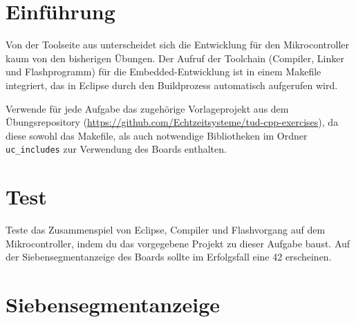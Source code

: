 
\newcommand{\exday}{5}
\cppSetTitle
\setcounter{section}{-1}



\cppSetHeaderAndMakeTitle



\section*{Einführung}
Von der Toolseite aus unterscheidet sich die Entwicklung für den Mikrocontroller kaum von den bisherigen Übungen.
Der Aufruf der Toolchain (Compiler, Linker und Flashprogramm) für die Embedded-Entwicklung ist in einem Makefile integriert, das in Eclipse durch den Buildprozess automatisch aufgerufen wird.

Verwende für jede Aufgabe das zugehörige Vorlageprojekt aus dem Übungsrepository (\url{https://github.com/Echtzeitsysteme/tud-cpp-exercises}), da diese sowohl das Makefile, als auch notwendige Bibliotheken im Ordner \texttt{uc\_includes} zur Verwendung des Boards enthalten.


\section{Test}
Teste das Zusammenspiel von Eclipse, Compiler und Flashvorgang auf dem Mikrocontroller, indem du das vorgegebene Projekt zu dieser Aufgabe baust.
Auf der Siebensegmentanzeige des Boards sollte im Erfolgsfall eine 42 erscheinen.



\section{Siebensegmentanzeige}
\label{exercise7Segment}

